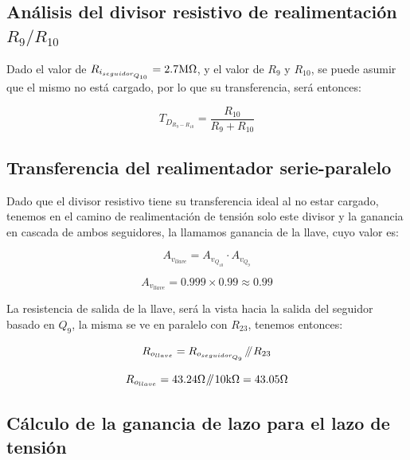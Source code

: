 \label{section:switch_small_signal_end}


\subsection{Análisis del divisor resistivo de realimentación $R_{9}/R_{10}$}

Dado el valor de $R_{i_{seguidor_{Q_{10}}}} = 2.7 \si[per-mode=symbol]{\mega\ohm}$, y el valor de $R_{9}$ y $R_{10}$, se puede asumir que el mismo no está cargado, por lo que su transferencia, será entonces:

\begin{equation}
T_{D_{R_{9}-R_{10}}} = \frac{R_{10}}{R_{9} + R_{10}}
\end{equation}



\subsection{Transferencia del realimentador \textbf{serie-paralelo}}

Dado que el divisor resistivo tiene su transferencia ideal al no estar cargado, tenemos en el camino de realimentación de tensión solo este divisor y la ganancia en cascada de ambos seguidores, la llamamos ganancia de la llave, cuyo valor es:


\begin{equation}
A_{v_{llave}} = A_{v_{Q_{10}}} \cdot A_{v_{Q_{9}}}
\end{equation}

\begin{equation*}
A_{v_{llave}} = 0.999 \times 0.99 \approx 0.99
\end{equation*}


La resistencia de salida de la llave, será la vista hacia la salida del seguidor basado en $Q_{9}$, la misma se ve en paralelo con $R_{23}$, tenemos entonces:

\begin{equation}
R_{o_{llave}} = R_{o_{seguidor_{Q_{9}}}} \parallelresistors R_{23}
\end{equation}

\begin{equation*}
R_{o_{llave}} = 43.24 \si[per-mode=symbol]{\ohm} \parallelresistors 10 \si[per-mode=symbol]{\kilo\ohm} = 43.05 \si[per-mode=symbol]{\ohm}
\end{equation*}


\subsection{Cálculo de la ganancia de lazo para el lazo de tensión}

